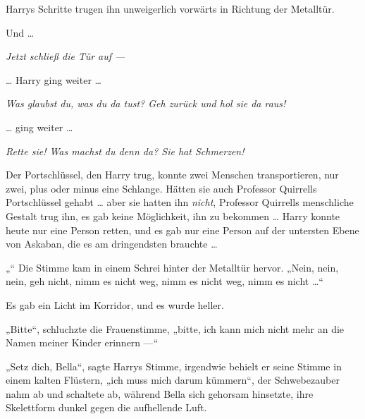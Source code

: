Harrys Schritte trugen ihn unweigerlich vorwärts in Richtung der Metalltür.

Und …

\emph{Jetzt schließ die Tür auf —}

… Harry ging weiter …

\emph{Was glaubst du, was du da tust? Geh zurück und hol sie da raus!}

… ging weiter …

\emph{Rette sie! Was machst du denn da? Sie hat Schmerzen! }

Der Portschlüssel, den Harry trug, konnte zwei Menschen transportieren, nur zwei, plus oder minus eine Schlange. Hätten sie auch Professor Quirrells Portschlüssel gehabt … aber sie hatten ihn \emph{nicht}, Professor Quirrells menschliche Gestalt trug ihn, es gab keine Möglichkeit, ihn zu bekommen … Harry konnte heute nur eine Person retten, und es gab nur eine Person auf der untersten Ebene von Askaban, die es am dringendsten brauchte …

„“ Die Stimme kam in einem Schrei hinter der Metalltür hervor.
„Nein, nein, nein, geh nicht, nimm es nicht weg, nimm es nicht weg, nimm es nicht …“

Es gab ein Licht im Korridor, und es wurde heller.

„Bitte“, schluchzte die Frauenstimme, „bitte, ich kann mich nicht mehr an die Namen meiner Kinder erinnern —“

„Setz dich, Bella“, sagte Harrys Stimme, irgendwie behielt er seine Stimme in einem kalten Flüstern, „ich muss mich darum kümmern“, der Schwebezauber nahm ab und schaltete ab, während Bella sich gehorsam hinsetzte, ihre Skelettform dunkel gegen die aufhellende Luft.

